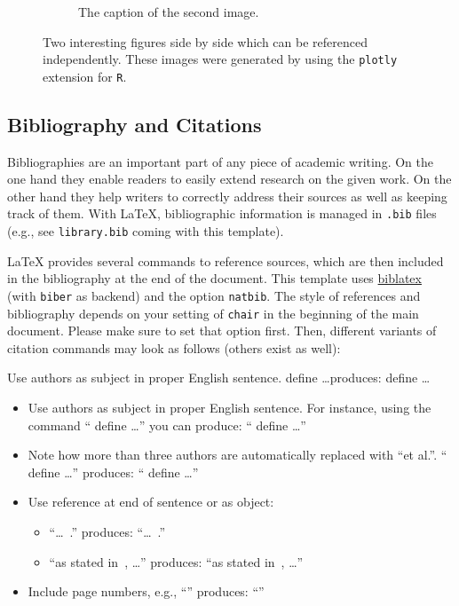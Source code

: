\documentclass[
    language=german, %
    thesis=bachelor, %
    supervisor=postdoc, %
    multiauthor=false, %
    ]{settings/csssa-thesis}
\begin{document}
\begin{figure}[ht]
\begin{subfigure}{0.49\textwidth}
        \caption{The caption of the second image.}\label{ch02:fig:fig1b}
    \end{subfigure}\label{ch02:fig:fig1}
    \caption{Two interesting figures side by side which can be referenced independently. These images were generated by using the \texttt{plotly} extension for \texttt{R}.}
\end{figure}

\subsection{Bibliography and Citations}

Bibliographies are an important part of any piece of academic writing. On the one hand they enable readers to easily extend research on the given work.  On the other hand they help writers to correctly address their sources as well as keeping track of them.  With \LaTeX{}, bibliographic information is managed in \texttt{.bib} files (e.g., see \texttt{library.bib} coming with this template).

\LaTeX{} provides several commands to reference sources, which are then included in the bibliography at the end of the document.  This template uses \href{http://ctan.org/pkg/biblatex}{biblatex} (with \texttt{biber} as backend) and the option \texttt{natbib}.  The style of references and bibliography depends on your setting of \texttt{chair} in the beginning of the main document.  Please make sure to set that option first.  Then, different variants of citation commands may look as follows (others exist as well):

Use authors as subject in proper English sentence.  define \ldots produces: \textcite{Goodfellow2016deep} define \ldots

\begin{itemize}
    \item Use authors as subject in proper English sentence. For instance, using the command  `` define \ldots'' you can produce: ``\textcite{Goodfellow2016deep} define \ldots''
    \item Note how more than three authors are automatically replaced with “et al.”. `` define \ldots'' produces: ``\textcite{Goodfellow2014gan} define \ldots''
    \item Use reference at end of sentence or as object:
      \begin{itemize}
      \item ``\ldots~.'' produces: ``\ldots~\citep{Goodfellow2014gan}.''
      \item ``as stated in~, \ldots'' produces: ``as stated in~\citep{Goodfellow2014gan}, \ldots''
      \end{itemize}
    \item Include page numbers, e.g., ``'' produces: ``\citep[p.~2]{Codd1970relational}''
    \end{itemize}
\end{document}
